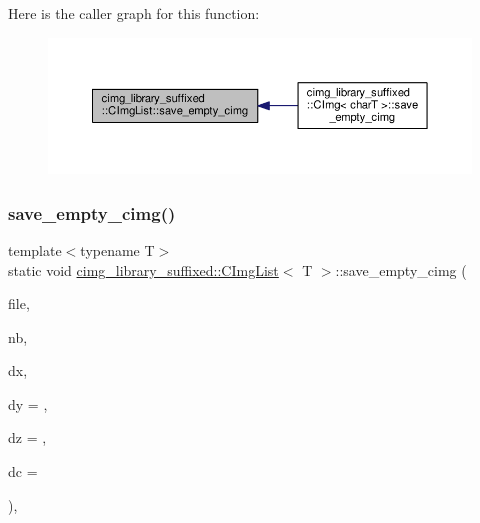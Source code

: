Here is the caller graph for this function\+:
\nopagebreak
\begin{figure}[H]
\begin{center}
\leavevmode
\includegraphics[width=350pt]{d5/d7e/structcimg__library__suffixed_1_1CImgList_a2374572081238aa19c9987d173ac28c2_icgraph}
\end{center}
\end{figure}
\mbox{\label{structcimg__library__suffixed_1_1CImgList_a88f04358691e1645b7f90196a7ca8fa6}} 
\subsubsection{\texorpdfstring{save\+\_\+empty\+\_\+cimg()}{save\_empty\_cimg()}\hspace{0.1cm}{\footnotesize\ttfamily [2/2]}}
{\footnotesize\ttfamily template$<$typename T$>$ \\
static void \hyperlink{structcimg__library__suffixed_1_1CImgList}{cimg\+\_\+library\+\_\+suffixed\+::\+C\+Img\+List}$<$ T $>$\+::save\+\_\+empty\+\_\+cimg (\begin{DoxyParamCaption}\item[{std\+::\+F\+I\+LE $\ast$const}]{file,  }\item[{const unsigned int}]{nb,  }\item[{const unsigned int}]{dx,  }\item[{const unsigned int}]{dy = {},  }\item[{const unsigned int}]{dz = {},  }\item[{const unsigned int}]{dc = {} }\end{DoxyParamCaption})\hspace{0.3cm}{\ttfamily [inline]}, {\ttfamily [static]}}



